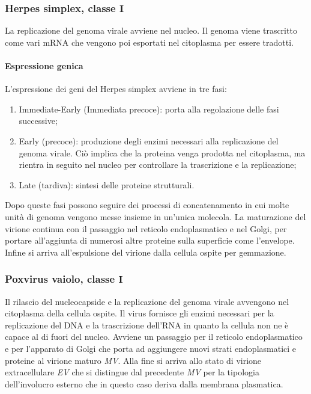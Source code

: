 		\subsubsection{Herpes simplex, classe $\mathbf{I}$}
		La replicazione del genoma virale avviene nel nucleo. 
		Il genoma viene trascritto come vari mRNA che vengono poi esportati nel citoplasma per essere tradotti. 

			\paragraph{Espressione genica}
			L'espressione dei geni del Herpes simplex avviene in tre fasi:
			\begin{multicols}{2}
				\begin{enumerate}
    					\item Immediate-Early (Immediata precoce): porta alla regolazione delle fasi successive; 
    					\item Early (precoce): produzione degli enzimi necessari alla replicazione del genoma virale. 
						Ci\`o implica che la proteina venga prodotta nel citoplasma, ma rientra in seguito nel nucleo per controllare la trascrizione e la replicazione;
    					\item Late (tardiva): sintesi delle proteine strutturali.
				\end{enumerate}
			\end{multicols}
			Dopo queste fasi possono seguire dei processi di concatenamento in cui molte unit\`a di genoma vengono messe insieme in un'unica molecola. 
			La maturazione del virione continua con il passaggio nel reticolo endoplasmatico e nel Golgi, per portare all'aggiunta di numerosi altre proteine sulla superficie come l'envelope. 
			Infine si arriva all'espulsione del virione dalla cellula ospite per gemmazione.

		\subsubsection{Poxvirus vaiolo, classe $\mathbf{I}$}
		Il rilascio del nucleocapside e la replicazione del genoma virale avvengono nel citoplasma della cellula ospite.
		Il virus fornisce gli enzimi necessari per la replicazione del DNA e la trascrizione dell'RNA in quanto la cellula non ne \`e capace al di fuori del nucleo.
		Avviene un passaggio per il reticolo endoplasmatico e per l'apparato di Golgi che porta ad aggiungere nuovi strati endoplasmatici e proteine al virione maturo \emph{MV}. 
		Alla fine si arriva allo stato di virione extracellulare \emph{EV} che si distingue dal precedente \emph{MV} per la tipologia dell'involucro esterno che in questo caso deriva dalla membrana plasmatica.

